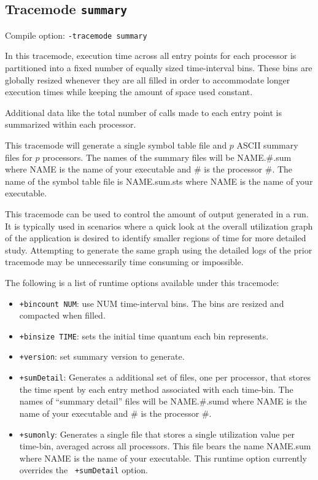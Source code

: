 \subsection{Tracemode {\tt summary}}
\label{sec::trace module summary}

Compile option: {\tt -tracemode summary}

In this tracemode, execution time across all entry points for each
processor is partitioned into a fixed number of equally sized
time-interval bins. These bins are globally resized whenever they are
all filled in order to accommodate longer execution times while keeping
the amount of space used constant.

Additional data like the total number of calls made to each entry
point is summarized within each processor.

This tracemode will generate a single symbol table file and $p$ ASCII
summary files for $p$ processors. The names of the summary files will
be NAME.\#.sum where NAME is the name of your executable and \# is the
processor \#. The name of the symbol table file is NAME.sum.sts where NAME
is the name of your executable.

This tracemode can be used to control the amount of output generated
in a run. It is typically used in scenarios where a quick look at the
overall utilization graph of the application is desired to identify
smaller regions of time for more detailed study. Attempting to
generate the same graph using the detailed logs of the prior tracemode
may be unnecessarily time consuming or impossible.

The following is a list of runtime options available under this tracemode:

\begin{itemize}
\item
{\tt +bincount NUM}:   use NUM time-interval bins. The bins are resized and compacted when filled.
\item
{\tt +binsize TIME}:   sets the initial time quantum each bin represents.
\item
{\tt +version}:        set summary version to generate.
\item
{\tt +sumDetail}: Generates a additional set of files, one per processor,
that stores the time spent by each entry method associated with each 
time-bin. The names of ``summary detail'' files will be NAME.\#.sumd where
NAME is the name of your executable and \# is the processor \#.
\item
{\tt +sumonly}: Generates a single file that stores a single
utilization value per time-bin, averaged across all processors. This
file bears the name NAME.sum where NAME is the name of your
executable. This runtime option currently overrides the {\tt
+sumDetail} option.
\end{itemize}

